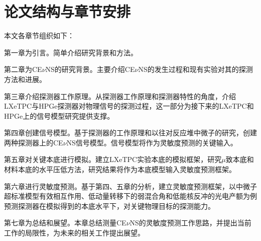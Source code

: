 \section{论文结构与章节安排}

本文各章节组织如下：

第一章为引言。简单介绍研究背景和方法。

第二章为CE$\nu$NS的研究背景。主要介绍CE$\nu$NS的发生过程和现有实验对其的探测方法和进展。

第三章介绍探测器工作原理。从探测器工作原理和探测器特性的角度，介绍LXeTPC与HPGe探测器对物理信号的探测过程，这一部分为接下来的LXeTPC和HPGe上的信号模型研究提供支撑。

第四章创建信号模型。基于探测器的工作原理和以往对反应堆中微子的研究，创建两种探测器上的CE$\nu$NS信号模型。信号模型将作为灵敏度预测的关键输入。

第五章对关键本底进行模拟。建立LXeTPC实验本底的模拟框架，研究$\mu$致本底和材料本底的水平压低方法，研究结果将作为本底模型输入灵敏度预测框架。

第六章进行灵敏度预测。基于第四、五章的分析，建立灵敏度预测框架，以中微子超标准模型有效相互作用、低动量转移下的弱混合角和低能核反冲的光电产额为例预测探测器在模拟得到的本底水平下，对关键物理目标的探测能力。

第七章为总结和展望。本章总结测量CE$\nu$NS的灵敏度预测工作思路，并提出当前工作的局限性，为未来的相关工作提出展望。
